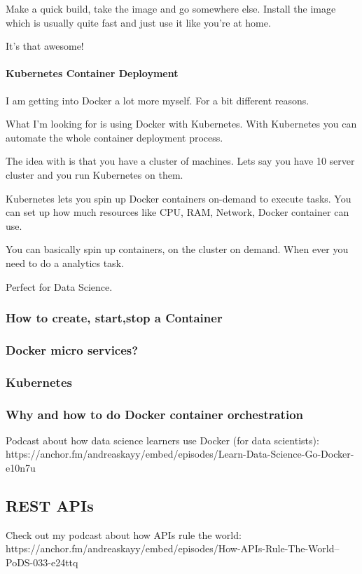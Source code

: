 \documentclass[12pt]{scrartcl} %
\begin{document}
Make a quick build, take the image and go somewhere else. Install the image which is usually quite fast and just use it like you’re at home.

It’s that awesome!

\paragraph{Kubernetes Container Deployment}

I am getting into Docker a lot more myself. For a bit different reasons.

What I’m looking for is using Docker with Kubernetes. With Kubernetes you can automate the whole container deployment process.

The idea with is that you have a cluster of machines. Lets say you have 10 server cluster and you run Kubernetes on them.

Kubernetes lets you spin up Docker containers on-demand to execute tasks. You can set up how much resources like CPU, RAM, Network, Docker container can use.

You can basically spin up containers, on the cluster on demand. When ever you need to do a analytics task.

Perfect for Data Science.
\subsubsection{How to create, start,stop a Container}
\subsubsection{Docker micro services?}
\subsubsection{Kubernetes}
\subsubsection{Why and how to do Docker container orchestration}
Podcast about how data science learners use Docker (for data scientists): https://anchor.fm/andreaskayy/embed/episodes/Learn-Data-Science-Go-Docker-e10n7u
  
 
 


\subsection{REST APIs}
Check out my podcast about how APIs rule the world: https://anchor.fm/andreaskayy/embed/episodes/How-APIs-Rule-The-World--PoDS-033-e24ttq
\end{document}

